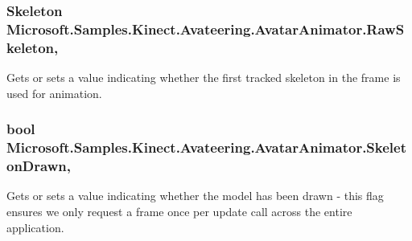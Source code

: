 \hypertarget{class_microsoft_1_1_samples_1_1_kinect_1_1_avateering_1_1_avatar_animator_ae4db88033826109723fb2ddf97f1331a}{
\subsubsection[{Raw\+Skeleton}]{\setlength{\rightskip}{0pt plus 5cm}Skeleton Microsoft.\+Samples.\+Kinect.\+Avateering.\+Avatar\+Animator.\+Raw\+Skeleton\hspace{0.3cm}{\ttfamily [get]}, {\ttfamily [set]}}}\label{class_microsoft_1_1_samples_1_1_kinect_1_1_avateering_1_1_avatar_animator_ae4db88033826109723fb2ddf97f1331a}


Gets or sets a value indicating whether the first tracked skeleton in the frame is used for animation. 

\hypertarget{class_microsoft_1_1_samples_1_1_kinect_1_1_avateering_1_1_avatar_animator_aac2c33858a422df79802e332db84fcd1}{
\subsubsection[{Skeleton\+Drawn}]{\setlength{\rightskip}{0pt plus 5cm}bool Microsoft.\+Samples.\+Kinect.\+Avateering.\+Avatar\+Animator.\+Skeleton\+Drawn\hspace{0.3cm}{\ttfamily [get]}, {\ttfamily [set]}}}\label{class_microsoft_1_1_samples_1_1_kinect_1_1_avateering_1_1_avatar_animator_aac2c33858a422df79802e332db84fcd1}


Gets or sets a value indicating whether the model has been drawn -\/ this flag ensures we only request a frame once per update call across the entire application. 

